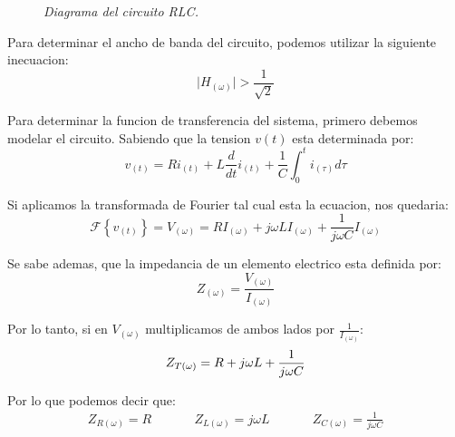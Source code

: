 \documentclass[a4paper,12pt]{report}
\begin{document}
\begin{enumerate}[label=\alph*), left=0pt]
\begin{figure}[h]
                    \textit{Diagrama del circuito RLC.}
                \end{figure}

                Para determinar el ancho de banda del circuito, podemos utilizar la siguiente inecuacion:
                \begin{equation}
                    \label{ancho.de.banda}
                    \lvert H_{(\omega)} \rvert > \frac{1}{\sqrt{2}}
                \end{equation}

                Para determinar la funcion de transferencia del sistema, primero debemos modelar el circuito. Sabiendo
                que la tension $v(t)$ esta determinada por:
                \begin{equation*}
                    v_{(t)} = Ri_{(t)} + L \frac{d}{dt} i_{(t)} + \frac{1}{C} \int_{0}^{t} i_{(\tau)} d\tau
                \end{equation*}

                Si aplicamos la transformada de Fourier tal cual esta la ecuacion, nos quedaria:
                \begin{equation*}
                    \mathcal{F} \left\{ v_{(t)} \right\} = V_{(\omega)} = R I_{(\omega)} + j \omega L I_{(\omega)} +
                        \frac{1}{j \omega C} I_{(\omega)}
                \end{equation*}

                Se sabe ademas, que la impedancia de un elemento electrico esta definida por:
                \begin{equation}
                    \label{impedancia}
                    Z_{(\omega)} = \frac{V_{(\omega)}}{I_{(\omega)}}
                \end{equation}

                Por lo tanto, si en $V_{(\omega)}$ multiplicamos de ambos lados por $\frac{1}{I_{(\omega)}}$:
                \begin{equation*}
                    Z_{T(\omega)} = R + j \omega L + \frac{1}{j \omega C}\\
                \end{equation*}

                Por lo que podemos decir que:
                \begin{align*}
                    Z_{R(\omega)} = R \hspace{1cm}\quad
                    Z_{L(\omega)} = j \omega L \hspace{1cm}\quad
                    Z_{C(\omega)} = \frac{1}{j \omega C}
                \end{align*}


\end{enumerate}
\end{document}
